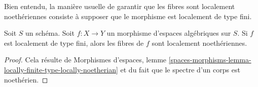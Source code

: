 \noindent
Bien entendu, la manière usuelle de garantir que les fibres sont localement noethériennes consiste
à supposer que le morphisme est localement de type fini.

\begin{lemma}
\label{lemma-locally-finite-type-locally-Noetherian-fibres}
Soit $S$ un schéma. Soit $f : X \to Y$ un morphisme d'espaces algébriques
sur $S$. Si $f$ est localement de type fini, alors
les fibres de $f$ sont localement noethériennes.
\end{lemma}

\begin{proof}
Cela résulte de Morphismes d'espaces, lemme
\ref{spaces-morphisms-lemma-locally-finite-type-locally-noetherian}
et du fait que le spectre d'un corps est noethérien.
\end{proof}


